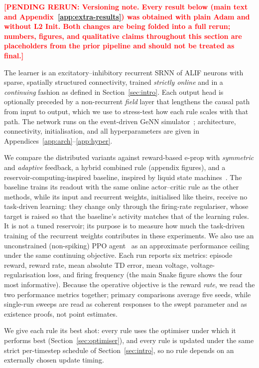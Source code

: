 \documentclass[10pt,twocolumn]{article}
\newcommand{\pending}[1]{\textcolor{red}{\bfseries[PENDING RERUN#1]}}
\newcommand{\variant}[1]{\textsf{#1}} %
\begin{document}
\pending{: \textbf{Versioning note.} Every result below (main text and
Appendix~\ref{app:extra-results}) was obtained with plain Adam and without
L2 Init. Both changes are being folded into a full rerun; numbers, figures,
and qualitative claims throughout this section are placeholders from the
prior pipeline and should not be treated as final.}

The learner is an excitatory--inhibitory recurrent SRNN of ALIF neurons with
sparse, spatially structured connectivity, trained \emph{strictly online} and in
a \emph{continuing} fashion as defined in Section~\ref{sec:intro}. Each output
head is optionally preceded by a non-recurrent \emph{field} layer that lengthens
the causal path from input to output, which we use to stress-test how each rule
scales with that path. The network runs on the event-driven GeNN
simulator~\citep{Yavuz2016GeNN}; architecture, connectivity, initialisation, and
all hyperparameters are given in Appendices~\ref{app:arch}--\ref{app:hyper}.

We compare the distributed variants against reward-based e-prop with
\emph{symmetric} and \emph{adaptive} feedback, a hybrid \variant{combined} rule
(appendix figures), and a reservoir-computing-inspired \variant{baseline}, inspired by liquid state
machines~\citep{Maass2002LSM}.
The baseline trains its readout with the same online actor--critic rule as
the other methods, while its input and recurrent weights, initialised like
theirs, receive no task-driven learning: they change only through the
firing-rate regulariser, whose target is raised so that the baseline's
activity matches that of the learning rules. It is not a tuned reservoir;
its purpose is to measure how much the task-driven training of the recurrent
weights contributes in these experiments. We also use an unconstrained
(non-spiking) PPO agent~\citep{schulman2017ppo,schulman2016gae} as an approximate
performance ceiling under the same continuing objective. Each run reports six
metrics: episode reward, reward rate, mean absolute TD error, mean voltage,
voltage-regularisation loss, and firing frequency (the main Snake figure shows
the four most informative). Because the operative
objective is the reward \emph{rate}, we read the
two performance metrics together; primary comparisons average five seeds, while
single-run sweeps are read as coherent responses to the swept parameter and as
existence proofs, not point estimates.

We give each rule its best shot: every rule uses the optimiser under which it
performs best (Section~\ref{sec:optimiser}), and every rule is updated under
the same strict per-timestep schedule of Section~\ref{sec:intro}, so no rule
depends on an externally chosen update timing.
\end{document}
